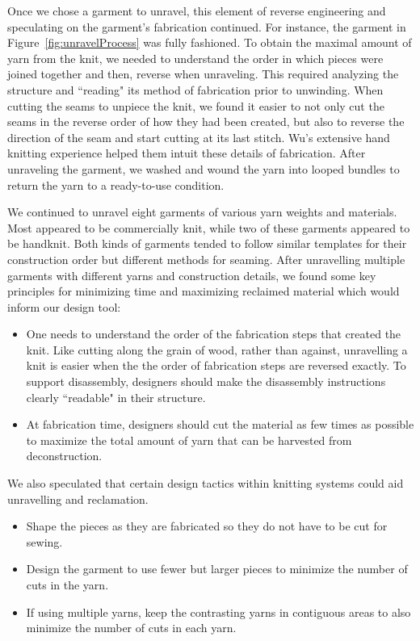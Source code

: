 Once we chose a garment to unravel, this element of reverse engineering and speculating on the garment's fabrication continued. For instance, the garment in Figure~\ref{fig:unravelProcess} was fully fashioned. To obtain the maximal amount of yarn from the knit, we needed to understand the order in which pieces were joined together and then, reverse when unraveling. This required analyzing the structure and ``reading" its method of fabrication prior to unwinding. When cutting the seams to unpiece the knit, we found it easier to not only cut the seams in the reverse order of how they had been created, but also to reverse the direction of the seam and start cutting at its last stitch. Wu's extensive hand knitting experience helped them intuit these details of fabrication. After unraveling the garment, we washed and wound the yarn into looped bundles to return the yarn to a ready-to-use condition.

We continued to unravel eight garments of various yarn weights and materials. Most appeared to be commercially knit, while two of these garments appeared to be handknit. Both kinds of garments tended to follow similar templates for their construction order but different methods for seaming. %
After unravelling multiple garments with different yarns and construction details, we found some key principles for minimizing time and maximizing reclaimed material which would inform our design tool: 

\begin{itemize}
    \item One needs to understand the order of the fabrication steps that created the knit. Like cutting along the grain of wood, rather than against, unravelling a knit is easier when the the order of fabrication steps are reversed exactly. To support disassembly, designers should make the disassembly instructions clearly ``readable" in their structure.
    \item At fabrication time, designers should cut the material as few times as possible to maximize the total amount of yarn that can be harvested from deconstruction.
\end{itemize}

We also speculated that certain design tactics within knitting systems could aid unravelling and reclamation.
\begin{itemize}
    \item Shape the pieces as they are fabricated so they do not have to be cut for sewing.
    \item Design the garment to use fewer but larger pieces to minimize the number of cuts in the yarn.
    \item If using multiple yarns, keep the contrasting yarns in contiguous areas to also minimize the number of cuts in each yarn.
\end{itemize}

